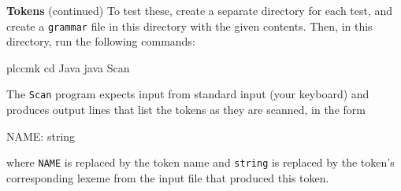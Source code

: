 \begin{minipage}[t]{\sw}
\slidenumber
\LARGE
{\bf Tokens} (continued)\exx
To test these, create a separate directory for each test,
and create a \verb'grammar' file in this directory
with the given contents.
Then, in this directory, run the following commands:
\begin{qv}
plccmk
cd Java
java Scan
\end{qv}
The \verb'Scan' program expects input from standard input
(your keyboard)
and produces output lines that list the tokens as they are scanned,
in the form
\begin{qv}
NAME: string
\end{qv}
where \verb'NAME' is replaced by the token name
and \verb'string' is replaced by the token's corresponding lexeme
from the input file
that produced this token.
\end{minipage}
\clearpage

